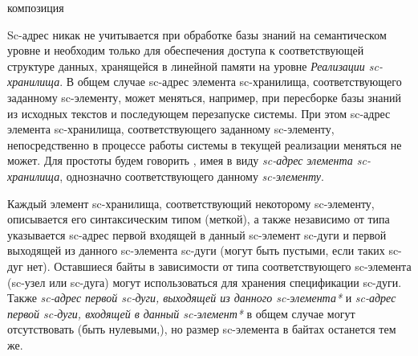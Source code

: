 
\begin{SCn}
\begin{scnreltovector}{композиция}
    \begin{scnindent}
    \end{scnindent}
    \scnitem{\scnnonamednode}
    \begin{scnindent}
        \begin{scnindent}
        \end{scnindent}
    \end{scnindent}
\end{scnreltovector}
\end{SCn}

Sc-адрес никак не учитывается при обработке базы знаний на семантическом уровне и необходим только для обеспечения
доступа к соответствующей структуре данных, хранящейся в линейной памяти на уровне \textit{Реализации sc-хранилища}.
В общем случае sc-адрес элемента sc-хранилища, соответствующего заданному sc-элементу, может меняться, например, при
пересборке базы знаний из исходных текстов и последующем перезапуске системы. При этом sc-адрес элемента sc-хранилища,
соответствующего заданному sc-элементу, непосредственно в процессе работы системы в текущей реализации меняться не может.
Для простоты будем говорить , имея в виду \textit{sc-адрес} \textit{элемента sc-хранилища},
однозначно соответствующего данному \textit{sc-элементу}.

Каждый элемент sc-хранилища, соответствующий некоторому sc-элементу, описывается его синтаксическим типом (меткой), а
также независимо от типа указывается sc-адрес первой входящей в данный sc-элемент sc-дуги и первой выходящей из данного
sc-элемента sc-дуги (могут быть пустыми, если таких sc-дуг нет). Оставшиеся байты в зависимости от типа соответствующего
sc-элемента (sc-узел или sc-дуга) могут использоваться для хранения спецификации sc-дуги. Также \textit{sc-адрес первой
sc-дуги, выходящей из данного sc-элемента*} и \textit{sc-адрес первой sc-дуги, входящей в данный sc-элемент*} в общем
случае могут отсутствовать (быть нулевыми,), но размер sc-элемента в байтах останется тем же.

